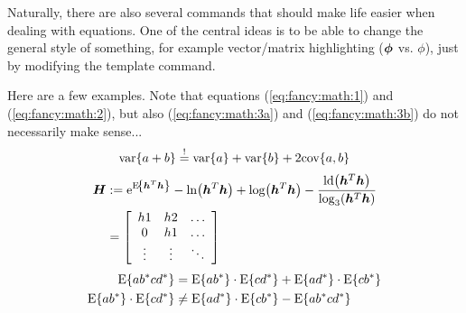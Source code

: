 
Naturally, there are also several commands that should make life easier when dealing with equations. One of the central ideas is to be able to change the general style of something, for example vector/matrix highlighting ($\bm{\phi}$ vs. $\phi$), just by modifying the template command.

\nxtpar\noindent
Here are a few examples. Note that equations (\ref{eq:fancy:math:1}) and (\ref{eq:fancy:math:2}), but also (\ref{eq:fancy:math:3a}) and (\ref{eq:fancy:math:3b}) do not necessarily make sense...
\begin{equation}
  \var{a + b} \isreq \var{a} + \var{b} + 2 \cov{a,b}
  \label{eq:fancy:math:1}
\end{equation}
\begin{equation}\begin{split}
  \vm{H}
  &\isdef \exp{\E{\vm{h}^T \vm{h}}} - \ln{\vm{h}^T \vm{h}} + \log{\vm{h}^T \vm{h}} - \frac{\ld{\vm{h}^T \vm{h}}}{\logb{3}{\vm{h}^T \vm{h}}} \\
  &= \mtx{ccc}{h1 & h2 & \dots \\ 0 & h1 & \dots \\ \vdots & \vdots & \ddots}
  \label{eq:fancy:math:2}
\end{split}\end{equation}
\begin{align}
  \E{ a b\conj c d\conj} &= \E{a b\conj} \cdot \E{c d\conj} + \E{a d\conj} \cdot \E{c b\conj} \label{eq:fancy:math:3a}\\
   \E{a b\conj} \cdot \E{c d\conj} &\neq  \E{a d\conj} \cdot \E{c b\conj} - \E{ a b\conj c d\conj}\label{eq:fancy:math:3b}
\end{align}